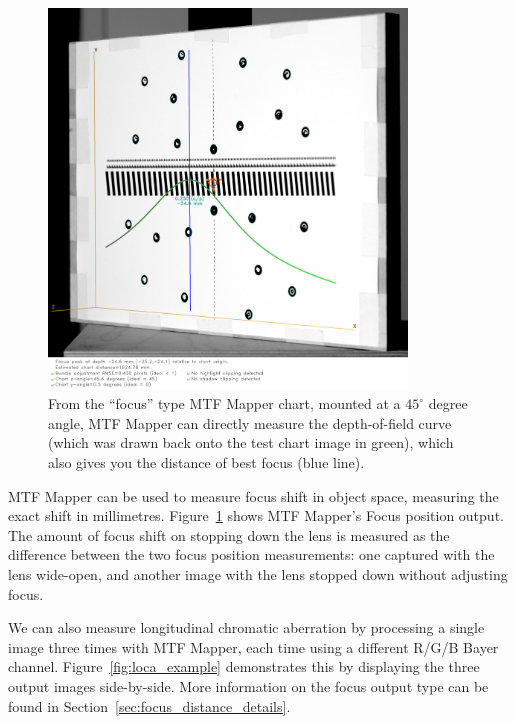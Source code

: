\documentclass[a4paper]{article}
\begin{document}
\begin{figure}[!ht]
\centering
\includegraphics[width=0.85\textwidth]{figures/focus_peak_example}
\caption{From the ``focus'' type MTF Mapper chart, mounted at a $45^\circ$
degree angle, MTF Mapper can directly measure the depth-of-field curve
(which was drawn back onto the test chart image in green),
which also gives you the distance of best focus (blue line).}
\label{fig:focus_example}
\end{figure}

MTF Mapper can be used to measure focus shift in object space, measuring the
exact shift in millimetres. Figure~\ref{fig:focus_example} shows 
MTF Mapper's \textsf{Focus position} output.
The amount of focus shift on stopping down the lens is
measured as the difference between the two focus position measurements: one
captured with the lens wide-open, and another image with the lens stopped down without adjusting
focus.

We can also measure longitudinal chromatic aberration by processing a single
image three times with MTF Mapper, each time using a different R/G/B Bayer
channel. Figure~\ref{fig:loca_example} demonstrates this by displaying the three output
images side-by-side. More information on the
\textsf{focus} output type can be found in
Section~\ref{sec:focus_distance_details}.
\end{document}
